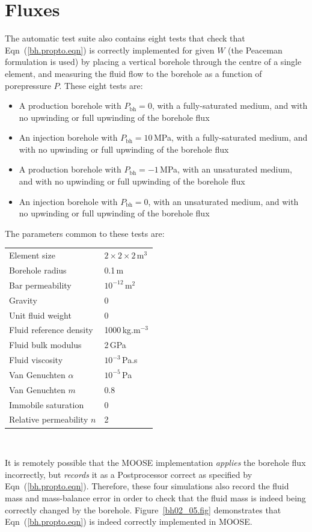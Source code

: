 \documentclass[]{scrreprt}
\begin{document}
\section{Fluxes}
The automatic test suite also contains eight tests that check that
Eqn~(\ref{bh.propto.eqn}) is correctly implemented for given $W$ (the
Peaceman formulation is used) by placing a vertical borehole through
the centre of a single element, and measuring the fluid flow to the
borehole as a function of porepressure $P$.  These eight tests are:
\begin{itemize}
\item A production borehole with $P_{\mathrm{bh}} = 0$, with a
  fully-saturated medium, and with no upwinding or full upwinding of the borehole flux
\item An injection borehole with $P_{\mathrm{bh}} = 10$\,MPa, with a
  fully-saturated medium, and with no upwinding or full upwinding of the borehole flux
\item A production borehole with $P_{\mathrm{bh}} = -1$\,MPa, with an
  unsaturated medium, and with no upwinding or full upwinding of the borehole flux
\item An injection borehole with $P_{\mathrm{bh}} = 0$, with an
  unsaturated medium, and with no upwinding or full upwinding of the borehole flux
\end{itemize}
The parameters common to these tests are:
\begin{center}
\begin{tabular}{|ll|}
\hline
Element size & $2\times 2\times 2$\,m$^{3}$ \\
Borehole radius & 0.1\,m \\
Bar permeability & $10^{-12}$\,m$^{2}$ \\
Gravity & 0 \\
Unit fluid weight & 0 \\
Fluid reference density & 1000\,kg.m$^{-3}$ \\
Fluid bulk modulus & 2\,GPa \\
Fluid viscosity & $10^{-3}$\,Pa.s \\
Van Genuchten $\alpha$ & $10^{-5}$\,Pa \\
Van Genuchten $m$ & 0.8  \\
Immobile saturation & 0 \\
Relative permeability $n$ & 2 \\
\hline
\end{tabular} \\
\end{center}
It is remotely possible that the MOOSE implementation {\em applies}
the borehole flux incorrectly, but {\em records} it as a Postprocessor
correct as specified by Eqn~(\ref{bh.propto.eqn}).  Therefore, these
four simulations also record the fluid mass and mass-balance error in
order to check that the fluid mass is indeed being correctly changed
by the borehole.  Figure~\ref{bh02_05.fig} demonstrates that
Eqn~(\ref{bh.propto.eqn}) is indeed correctly implemented in MOOSE.
\end{document}
